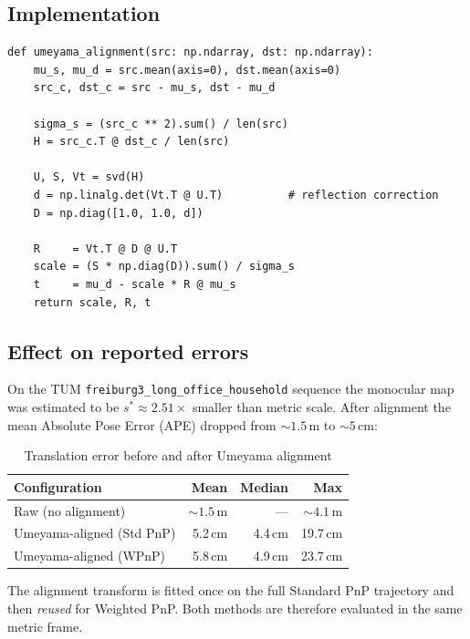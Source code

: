 \documentclass[11pt,a4paper]{article}
\begin{document}
\subsection{Implementation}

\begin{lstlisting}[style=python, caption={\texttt{umeyama\_alignment()} in \texttt{plot.py}}]
def umeyama_alignment(src: np.ndarray, dst: np.ndarray):
    mu_s, mu_d = src.mean(axis=0), dst.mean(axis=0)
    src_c, dst_c = src - mu_s, dst - mu_d

    sigma_s = (src_c ** 2).sum() / len(src)
    H = src_c.T @ dst_c / len(src)

    U, S, Vt = svd(H)
    d = np.linalg.det(Vt.T @ U.T)          # reflection correction
    D = np.diag([1.0, 1.0, d])

    R     = Vt.T @ D @ U.T
    scale = (S * np.diag(D)).sum() / sigma_s
    t     = mu_d - scale * R @ mu_s
    return scale, R, t
\end{lstlisting}

\subsection{Effect on reported errors}

On the TUM \texttt{freiburg3\_long\_office\_household} sequence the monocular
map was estimated to be $s^* \approx 2.51\times$ smaller than metric scale.
After alignment the mean Absolute Pose Error (APE) dropped from ${\sim}1.5$\,m
to ${\sim}5$\,cm:

\begin{table}[H]
\centering
\caption{Translation error before and after Umeyama alignment}
\begin{tabularx}{0.75\textwidth}{@{}X r r r@{}}
\toprule
\textbf{Configuration} & \textbf{Mean} & \textbf{Median} & \textbf{Max} \\
\midrule
Raw (no alignment)     & ${\sim}1.5$\,m  & ---     & ${\sim}4.1$\,m \\
Umeyama-aligned (Std PnP)  & 5.2\,cm & 4.4\,cm & 19.7\,cm \\
Umeyama-aligned (WPnP)     & 5.8\,cm & 4.9\,cm & 23.7\,cm \\
\bottomrule
\end{tabularx}
\end{table}

\begin{notebox}
  The alignment transform is fitted once on the full Standard PnP trajectory
  and then \emph{reused} for Weighted PnP. Both methods are therefore evaluated
  in the same metric frame.
\end{notebox}
\end{document}
